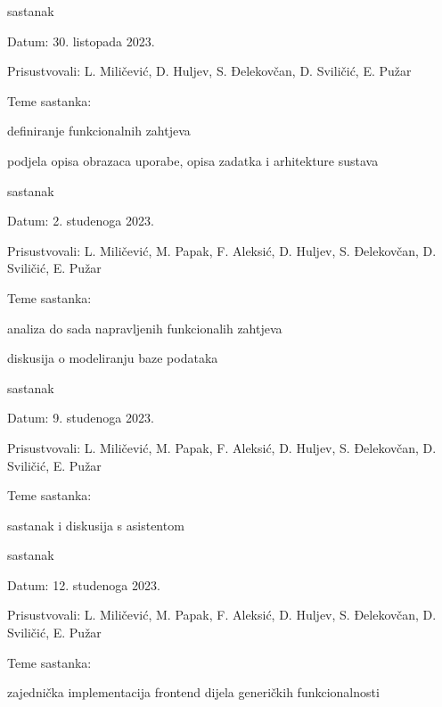 \begin{packed_enum}
			\item  sastanak
			\item[] \begin{packed_item}
				\item Datum: 30. listopada 2023.
				\item Prisustvovali: L. Miličević, D. Huljev, S. Đelekovčan, D. Sviličić, E. Pužar
				\item Teme sastanka:
				\begin{packed_item}
					\item  definiranje funkcionalnih zahtjeva
					\item  podjela opisa obrazaca uporabe, opisa zadatka i arhitekture sustava
				\end{packed_item}
			\end{packed_item}

			\item  sastanak
			\item[] \begin{packed_item}
				\item Datum: 2. studenoga 2023.
				\item Prisustvovali: L. Miličević, M. Papak, F. Aleksić, D. Huljev, S. Đelekovčan, D. Sviličić, E. Pužar
				\item Teme sastanka:
				\begin{packed_item}
					\item  analiza do sada napravljenih funkcionalih zahtjeva
					\item  diskusija o modeliranju baze podataka
				\end{packed_item}
			\end{packed_item}

			\item  sastanak
			\item[] \begin{packed_item}
				\item Datum: 9. studenoga 2023.
				\item Prisustvovali: L. Miličević, M. Papak, F. Aleksić, D. Huljev, S. Đelekovčan, D. Sviličić, E. Pužar
				\item Teme sastanka:
				\begin{packed_item}
					\item  sastanak i diskusija s asistentom
				\end{packed_item}
			\end{packed_item}

			\item  sastanak
			\item[] \begin{packed_item}
				\item Datum: 12. studenoga 2023.
				\item Prisustvovali: L. Miličević, M. Papak, F. Aleksić, D. Huljev, S. Đelekovčan, D. Sviličić, E. Pužar
				\item Teme sastanka:
				\begin{packed_item}
					\item  zajednička implementacija frontend dijela generičkih funkcionalnosti
				\end{packed_item}
			\end{packed_item}


\end{packed_enum}
